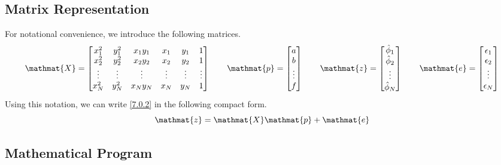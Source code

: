 \documentclass[12pt]{report}
\newcommand{\mat}[1]{\mathmat{#1}}
\begin{document}
\subsection{Matrix Representation}
For notational convenience, we introduce the following matrices.
%
\begin{equation}\label{7.0.3}
    \mat{X} =
    \begin{bmatrix}
        x_1^2  & y_1^2  & x_1y_1 & x_1    & y_1    & 1 \\
        x_2^2  & y_2^2  & x_2y_2 & x_2    & y_2    & 1 \\
        \vdots & \vdots & \vdots & \vdots & \vdots & \vdots \\
        x_N^2  & y_N^2  & x_Ny_N & x_N    & y_N    & 1
    \end{bmatrix}
    \qquad
    \mat{p} =
    \begin{bmatrix}
        a \\
        b \\
        \vdots \\
        f
    \end{bmatrix}
    \qquad
    \mat{z} =
    \begin{bmatrix}
        \hat{\phi}_1 \\
        \hat{\phi}_2 \\
        \vdots \\
        \hat{\phi}_N \\
    \end{bmatrix}
    \qquad
    \mat{e} =
    \begin{bmatrix}
        \epsilon_1 \\
        \epsilon_2 \\
        \vdots \\
        \epsilon_N \\
    \end{bmatrix}
\end{equation}
%
Using this notation, we can write \eqref{7.0.2} in the following compact form.
%
\begin{equation}\label{7.0.4}
    \mat{z} = \mat{X} \mat{p} + \mat{e}
\end{equation}

\subsection{Mathematical Program}
\end{document}
